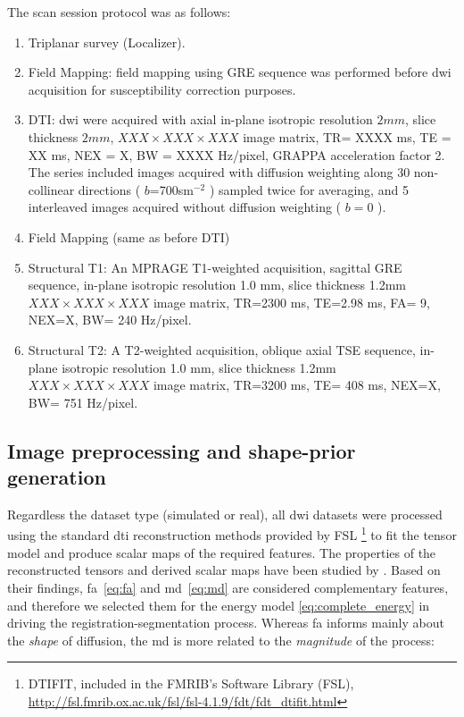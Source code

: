 The scan session protocol was as follows:
\begin{enumerate}
\item Triplanar survey (Localizer).
\item Field Mapping: field mapping using GRE sequence was performed before \gls{dwi}
acquisition for susceptibility correction purposes.
\item DTI: \gls{dwi} were acquired with axial in-plane 
isotropic resolution $2mm$, slice thickness $2mm$, $XXX \times XXX \times XXX$ 
image matrix, TR= XXXX ms, TE = XX ms, NEX = X, BW = XXXX Hz/pixel, GRAPPA
acceleration factor 2. The series included images acquired with diffusion
weighting along 30 non-collinear directions ( $b$=700sm$^{-2}$ ) sampled
twice for averaging, and 5 interleaved images acquired without diffusion 
weighting ( $b=0$ ).
\item Field Mapping (same as before DTI)
\item Structural T1: An MPRAGE T1-weighted acquisition, sagittal
GRE sequence, in-plane isotropic resolution 1.0 mm, slice thickness 1.2mm
$XXX \times XXX \times XXX$ image matrix, TR=2300 ms, TE=2.98 ms, FA= 9, NEX=X, BW= 240 Hz/pixel.
\item Structural T2: A T2-weighted acquisition, oblique axial
TSE sequence, in-plane isotropic resolution 1.0 mm, slice thickness 1.2mm
$XXX \times XXX \times XXX$ image matrix, TR=3200 ms, TE= 408 ms, NEX=X, BW= 751 Hz/pixel.
\end{enumerate}


\subsection{Image preprocessing and shape-prior generation}
\label{sec:preprocessing}
%
Regardless the dataset type (simulated or real), all \gls{dwi} datasets were processed
using the standard \gls{dti} reconstruction methods provided by FSL \footnote{DTIFIT, 
included in the FMRIB's Software Library (FSL), 
\url{http://fsl.fmrib.ox.ac.uk/fsl/fsl-4.1.9/fdt/fdt_dtifit.html}} to fit
the tensor model and produce scalar maps of the required features.
The properties of the reconstructed tensors and derived scalar maps have
been studied by \cite{ennis_orthogonal_2006}. Based on their
findings, \gls{fa}~\eqref{eq:fa} and \gls{md}~\eqref{eq:md} are
considered complementary features, and therefore we selected them for the 
energy model \eqref{eq:complete_energy} in driving the 
registration-segmentation process. 
Whereas \gls{fa} informs mainly about the \emph{shape} of diffusion, 
the \gls{md} is more related to the \emph{magnitude} of the process:

